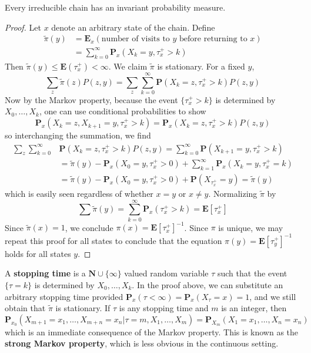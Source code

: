 \begin{theorem}
    Every irreducible chain has an invariant probability measure.
\end{theorem}
\begin{proof}
    Let $x$ denote an arbitrary state of the chain. Define
    \begin{align*}
        \tilde{\pi}(y) &= \mathbf{E}_x(\text{number of visits to $y$ before returning to $x$})\\
        &= \sum_{k = 0}^\infty \mathbf{P}_x(X_k = y, \tau_x^+ > k)
    \end{align*}
    Then $\tilde{\pi}(y) \leq \mathbf{E}(\tau_x^+) < \infty$. We claim $\tilde{\pi}$ is stationary. For a fixed $y$,
    \[ \sum_z \tilde{\pi}(z) P(z,y) = \sum_z \sum_{k = 0}^\infty \mathbf{P}(X_k = z, \tau_x^+ > k) P(z,y) \]
    Now by the Markov property, because the event $\{ \tau_x^+ > k \}$ is determined by $X_0, \dots, X_k$, one can use conditional probabilities to show
    \[ \mathbf{P}_x(X_k = z, X_{k+1} = y, \tau_x^+ > k) = \mathbf{P}_x(X_k = z, \tau_x^+ > k) P(z,y) \]
    so interchanging the summation, we find
    \begin{align*}
        \sum_z \sum_{k = 0}^\infty & \mathbf{P}(X_k = z, \tau_x^+ > k) P(z,y) = \sum_{k = 0}^\infty \mathbf{P}(X_{k+1} = y, \tau_x^+ > k)\\
        &= \tilde{\pi}(y) - \mathbf{P}_x(X_0 = y, \tau_x^+ > 0) + \sum_{k = 1}^\infty \mathbf{P}_x(X_k = y, \tau_x^+ = k)\\
        &= \tilde{\pi}(y) - \mathbf{P}_x(X_0 = y, \tau_x^+ > 0) + \mathbf{P}(X_{\tau_x^+} = y) = \tilde{\pi}(y)
    \end{align*}
    which is easily seen regardless of whether $x = y$ or $x \neq y$. Normalizing $\tilde{\pi}$ by
    \[ \sum \tilde{\pi}(y) = \sum_{k = 0}^\infty \mathbf{P}_x(\tau_x^+ > k) = \mathbf{E}[\tau_x^+] \]
    Since $\tilde{\pi}(x) = 1$, we conclude $\pi(x) = \mathbf{E}[\tau_x^+]^{-1}$. Since $\pi$ is unique, we may repeat this proof for all states to conclude that the equation $\pi(y) = \mathbf{E}[\tau_y^+]^{-1}$ holds for all states $y$.
\end{proof}

A {\bf stopping time} is a $\mathbf{N} \cup \{ \infty \}$ valued random variable $\tau$ such that the event $\{ \tau = k \}$ is determined by $X_0, \dots, X_k$. In the proof above, we can substitute an arbitrary stopping time provided $\mathbf{P}_x(\tau < \infty) = \mathbf{P}_x(X_\tau = x) = 1$, and we still obtain that $\tilde{\pi}$ is stationary. If $\tau$ is any stopping time and $m$ is an integer, then
%
\[ \mathbf{P}_{x_0}(X_{m + 1} = x_1, \dots, X_{m + n} = x_n | \tau = m, X_1, \dots, X_m) = \mathbf{P}_{X_m}(X_1 = x_1, \dots, X_n = x_n) \]
%
which is an immediate consequence of the Markov property. This is known as the {\bf strong Markov property}, which is less obvious in the continuous setting.

